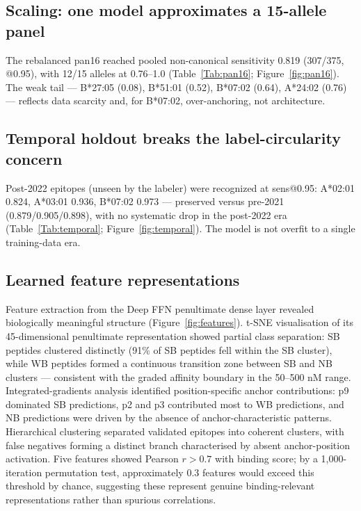 \subsection{Scaling: one model approximates a 15-allele panel}
The rebalanced pan16 reached pooled non-canonical sensitivity 0.819 (307/375, @0.95), with 12/15 alleles at 0.76--1.0 (Table~\ref{Tab:pan16}; Figure~\ref{fig:pan16}). The weak tail --- B*27:05 (0.08), B*51:01 (0.52), B*07:02 (0.64), A*24:02 (0.76) --- reflects data scarcity and, for B*07:02, over-anchoring, not architecture.

\subsection{Temporal holdout breaks the label-circularity concern}
Post-2022 epitopes (unseen by the labeler) were recognized at sens@0.95: A*02:01 0.824, A*03:01 0.936, B*07:02 0.973 --- preserved versus pre-2021 (0.879/0.905/0.898), with no systematic drop in the post-2022 era (Table~\ref{Tab:temporal}; Figure~\ref{fig:temporal}). The model is not overfit to a single training-data era.

\subsection{Learned feature representations}
Feature extraction from the Deep FFN penultimate dense layer revealed biologically meaningful structure (Figure~\ref{fig:features}). t-SNE visualisation of its 45-dimensional penultimate representation showed partial class separation: SB peptides clustered distinctly (91\% of SB peptides fell within the SB cluster), while WB peptides formed a continuous transition zone between SB and NB clusters --- consistent with the graded affinity boundary in the 50--500 nM range. Integrated-gradients analysis identified position-specific anchor contributions: p9 dominated SB predictions, p2 and p3 contributed most to WB predictions, and NB predictions were driven by the absence of anchor-characteristic patterns. Hierarchical clustering separated validated epitopes into coherent clusters, with false negatives forming a distinct branch characterised by absent anchor-position activation. Five features showed Pearson $r > 0.7$ with binding score; by a 1,000-iteration permutation test, approximately 0.3 features would exceed this threshold by chance, suggesting these represent genuine binding-relevant representations rather than spurious correlations.

